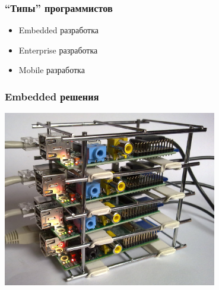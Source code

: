 \documentclass[10pt,pdf,hyperref={unicode}]{beamer}
\begin{document}
\begin{frame}
	\frametitle{``Типы'' программистов }
		\begin{itemize}
			\item Embedded разработка
			\item Enterprise разработка
			\item Mobile разработка
		\end{itemize}		
\end{frame}


\begin{frame}
\frametitle{ Embedded решения }
	\center
		\includegraphics[width=0.7\textwidth]{./rasbery.png}
\end{frame}
\end{document}
